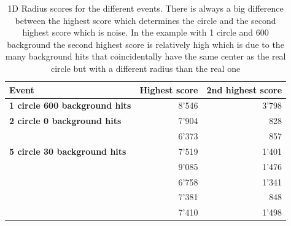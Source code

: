 \documentclass[11pt]{scrreprt}
\begin{document}
\begin{table}[tbp]
  \caption[1D Radius scores for the different events]{1D Radius scores for the different events. There is always a big difference between the highest score
  which determines the circle and the second highest score which is noise. In the example with 1 circle and 600
  background the second highest score is relatively high which is due to the many background hits that coincidentally
  have the same center as the real circle but with a different radius than the real one}
  \label{tab:1d_scores}
  \centering

  \begin{tabular}{lrr}
  \toprule




  \midrule
  \textbf{Event} & \textbf{Highest score} & \textbf{2nd highest score} \\
  \midrule
  \textbf{1 circle 600 background hits} & 8'546 & 3'798\\
  \midrule
  \textbf{2 circle 0 background hits} & 7'904 & 828\\
   & 6'373 & 857\\
  \midrule
  \textbf{5 circle 30 background hits} & 7'519 & 1'401\\
  & 9'085 & 1'476\\
  & 6'758 & 1'341\\
  & 7'381 & 848\\
  & 7'410 & 1'498\\
  \bottomrule
  \end{tabular}
\end{table}
\end{document}
